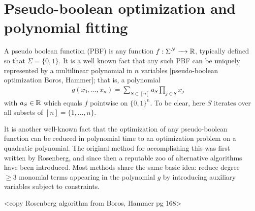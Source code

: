 \documentclass{article}
\begin{document}
\section{Pseudo-boolean optimization and polynomial fitting}
A pseudo boolean function (PBF) is any function $f:\Sigma^N\to \bR$, typically defined so that $\Sigma = \{0,1\}$. It is a well known fact that any such PBF can be uniquely represented by a multilinear polynomial in $n$ variables [pseudo-boolean optimization Boros, Hammer]; that is, a polynomial
\begin{align*}
  g(x_1,...,x_n) = \sum_{S \subset [n]} a_S \prod_{j \in S}x_j
\end{align*}
with $a_S \in \mathbb{R}$ which equals $f$ pointwise on $\{0,1\}^n$. To be clear, here $S$ iterates over all subsets of $[n] = \{1,...,n\}$.

It is another well-known fact that the optimization of any pseudo-boolean function can be reduced in polynomial time to an optimization problem on a quadratic polynomial. The original method for accomplishing this was first written by Rosenberg, and since then a reputable zoo of alternative algorithms have been introduced. Most methods share the same basic idea: reduce degree $\geq 3$ monomial terms appearing in the polynomial $g$ by introducing auxiliary variables subject to constraints.

<copy Rosenberg algorithm from Boros, Hammer pg 168>
\end{document}
